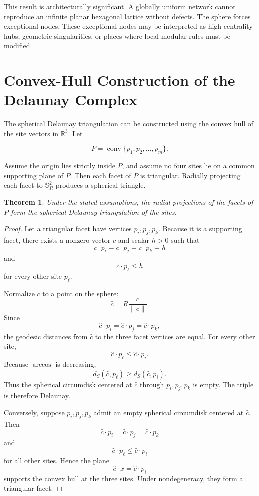 \documentclass[11pt,fleqn]{book}
\numberwithin{equation}{chapter}
\theoremstyle{plain}
\newtheorem{theorem}{Theorem}[chapter]
\theoremstyle{definition}
\theoremstyle{remark}
\newcommand{\Sphere}{\mathbb{S}^{2}}
\newcommand{\R}{\mathbb{R}}
\newcommand{\conv}{\operatorname{conv}}
\begin{document}
This result is architecturally significant. A globally uniform network cannot reproduce an infinite planar hexagonal lattice without defects. The sphere forces exceptional nodes. These exceptional nodes may be interpreted as high-centrality hubs, geometric singularities, or places where local modular rules must be modified.

\section{Convex-Hull Construction of the Delaunay Complex}

The spherical Delaunay triangulation can be constructed using the convex hull of the site vectors in \(\R^3\). Let

\begin{equation}
    P
    =
    \conv\{p_1,p_2,\dots,p_m\}.
\end{equation}

Assume the origin lies strictly inside \(P\), and assume no four sites lie on a common supporting plane of \(P\). Then each facet of \(P\) is triangular. Radially projecting each facet to \(\Sphere_R\) produces a spherical triangle.

\begin{theorem}
Under the stated assumptions, the radial projections of the facets of \(P\) form the spherical Delaunay triangulation of the sites.
\end{theorem}

\begin{proof}
Let a triangular facet have vertices \(p_i,p_j,p_k\). Because it is a supporting facet, there exists a nonzero vector \(c\) and scalar \(h>0\) such that
\[
c\cdot p_i
=
c\cdot p_j
=
c\cdot p_k
=
h
\]
and
\[
c\cdot p_\ell
\leq h
\]
for every other site \(p_\ell\).

Normalize \(c\) to a point on the sphere:
\[
\widehat c
=
R\frac{c}{\|c\|}.
\]
Since
\[
\widehat c\cdot p_i
=
\widehat c\cdot p_j
=
\widehat c\cdot p_k,
\]
the geodesic distances from \(\widehat c\) to the three facet vertices are equal. For every other site,
\[
\widehat c\cdot p_\ell
\leq
\widehat c\cdot p_i.
\]
Because \(\arccos\) is decreasing,
\[
d_S(\widehat c,p_\ell)
\geq
d_S(\widehat c,p_i).
\]
Thus the spherical circumdisk centered at \(\widehat c\) through \(p_i,p_j,p_k\) is empty. The triple is therefore Delaunay.

Conversely, suppose \(p_i,p_j,p_k\) admit an empty spherical circumdisk centered at \(\widehat c\). Then
\[
\widehat c\cdot p_i
=
\widehat c\cdot p_j
=
\widehat c\cdot p_k
\]
and
\[
\widehat c\cdot p_\ell
\leq
\widehat c\cdot p_i
\]
for all other sites. Hence the plane
\[
\widehat c\cdot x
=
\widehat c\cdot p_i
\]
supports the convex hull at the three sites. Under nondegeneracy, they form a triangular facet.
\end{proof}
\end{document}
